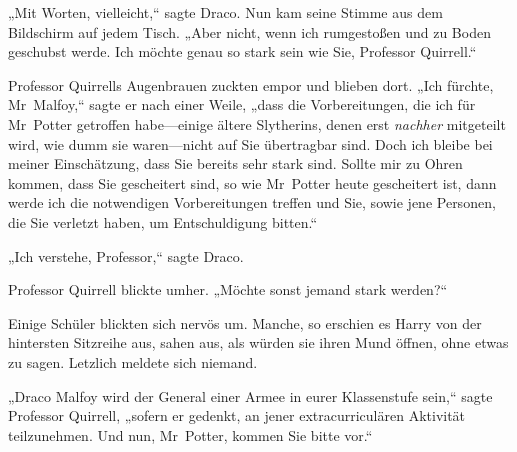 „Mit Worten, vielleicht,“ sagte Draco. Nun kam seine Stimme aus dem Bildschirm auf jedem Tisch. „Aber nicht, wenn ich rumgestoßen und zu Boden geschubst werde. Ich möchte genau so stark sein wie Sie, Professor Quirrell.“

Professor Quirrells Augenbrauen zuckten empor und blieben dort. „Ich fürchte, Mr~Malfoy,“ sagte er nach einer Weile, „dass die Vorbereitungen, die ich für Mr~Potter getroffen habe—einige ältere Slytherins, denen erst \emph{nachher} mitgeteilt wird, wie dumm sie waren—nicht auf Sie übertragbar sind. Doch ich bleibe bei meiner Einschätzung, dass Sie bereits sehr stark sind. Sollte mir zu Ohren kommen, dass Sie gescheitert sind, so wie Mr~Potter heute gescheitert ist, dann werde ich die notwendigen Vorbereitungen treffen und Sie, sowie jene Personen, die Sie verletzt haben, um Entschuldigung bitten.“

„Ich verstehe, Professor,“ sagte Draco.

Professor Quirrell blickte umher. „Möchte sonst jemand stark werden?“

Einige Schüler blickten sich nervös um. Manche, so erschien es Harry von der hintersten Sitzreihe aus, sahen aus, als würden sie ihren Mund öffnen, ohne etwas zu sagen. Letzlich meldete sich niemand.

„Draco Malfoy wird der General einer Armee in eurer Klassenstufe sein,“ sagte Professor Quirrell, „sofern er gedenkt, an jener extracurriculären Aktivität teilzunehmen. Und nun, Mr~Potter, kommen Sie bitte vor.“

